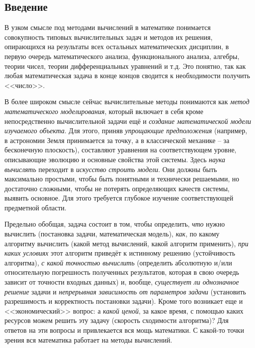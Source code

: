 \documentclass[12pt, a4paper]{article}
\begin{document}
\subsection{Введение}

В узком смысле под методами вычислений в математике понимается совокупность типовых вычислительных задач и методов их решения, опирающихся на результаты всех остальных математических дисциплин, в первую очередь математического анализа, функционального анализа, алгебры, теории чисел, теории дифференциальных уравнений и т.д. Это понятно, так как любая математическая задача в конце концов сводится к необходимости получить <<число>>.

В более широком смысле сейчас вычислительные методы понимаются как \textit{метод математического моделирования}, который включает в себя кроме непосредственно вычислительной задачи ещё и \textit{создание математической модели изучаемого объекта}. Для этого, приняв \textit{упрощающие предположения} (например, в астрономии Земля принимается за точку, а в классической механике -- за бесконечную плоскость), составляют уравнения на соответствующем уровне, описывающие эволюцию и основные свойства этой системы. Здесь \textit{наука вычислять} переходит в \textit{искусство строить модели}. Они должны быть максимально простыми, чтобы быть понятными и технически решаемыми, но достаточно сложными, чтобы не потерять определяющих качеств системы, выявить основное. Для этого требуется глубокое изучение соответствующей предметной области.

Предельно обобщая, задача состоит в том, чтобы определить, \textit{что} нужно вычислить (постановка задачи, математическая модель), \textit{как}, по какому алгоритму вычислить (какой метод вычислений, какой алгоритм применить), \textit{при каких условиях} этот алгоритм приведёт к истинному решению (устойчивость алгоритма), \textit{с какой точностью вычислить} (определить абсолютную и/или относительную погрешность полученных
результатов, которая в свою очередь зависит от точности входных данных) и, вообще, \textit{существует ли однозначное решение} задачи и \textit{непрерывная зависимость от параметров задачи} (установить разрешимость и корректность постановки задачи). Кроме того возникает еще и <<экономический>> вопрос: а \textit{какой ценой}, за какое время, с помощью каких ресурсов можем решить эту задачу (скорость сходимости алгоритма)? Для ответов на эти
вопросы и привлекается вся мощь математики. С какой-то точки зрения вся математика работает на методы вычислений.
\end{document}
